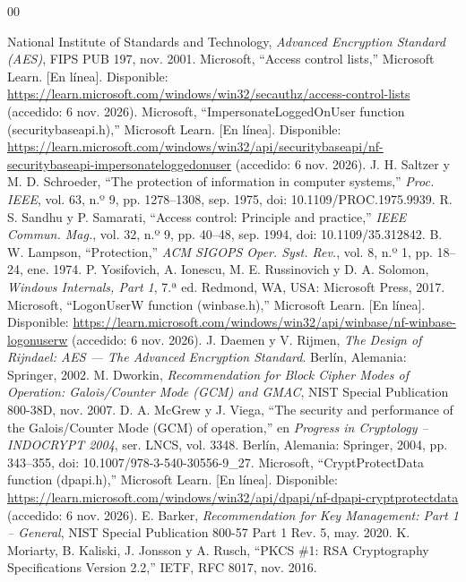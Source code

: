 \documentclass[conference]{IEEEtran}
\begin{document}
\begin{thebibliography}{00}
\raggedright
{} National Institute of Standards and Technology, \textit{Advanced Encryption Standard (AES)}, FIPS PUB 197, nov. 2001.
 Microsoft, ``Access control lists,'' Microsoft Learn. [En línea]. Disponible: \url{https://learn.microsoft.com/windows/win32/secauthz/access-control-lists} (accedido: 6 nov. 2026).
 Microsoft, ``ImpersonateLoggedOnUser function (securitybaseapi.h),'' Microsoft Learn. [En línea]. Disponible: \url{https://learn.microsoft.com/windows/win32/api/securitybaseapi/nf-securitybaseapi-impersonateloggedonuser} (accedido: 6 nov. 2026).
 J. H. Saltzer y M. D. Schroeder, ``The protection of information in computer systems,'' \textit{Proc. IEEE}, vol. 63, n.º 9, pp. 1278--1308, sep. 1975, doi: 10.1109/PROC.1975.9939.
 R. S. Sandhu y P. Samarati, ``Access control: Principle and practice,'' \textit{IEEE Commun. Mag.}, vol. 32, n.º 9, pp. 40--48, sep. 1994, doi: 10.1109/35.312842.
 B. W. Lampson, ``Protection,'' \textit{ACM SIGOPS Oper. Syst. Rev.}, vol. 8, n.º 1, pp. 18--24, ene. 1974.
 P. Yosifovich, A. Ionescu, M. E. Russinovich y D. A. Solomon, \textit{Windows Internals, Part 1}, 7.ª ed. Redmond, WA, USA: Microsoft Press, 2017.
 Microsoft, ``LogonUserW function (winbase.h),'' Microsoft Learn. [En línea]. Disponible: \url{https://learn.microsoft.com/windows/win32/api/winbase/nf-winbase-logonuserw} (accedido: 6 nov. 2026).
 J. Daemen y V. Rijmen, \textit{The Design of Rijndael: AES --- The Advanced Encryption Standard}. Berlín, Alemania: Springer, 2002.
 M. Dworkin, \textit{Recommendation for Block Cipher Modes of Operation: Galois/Counter Mode (GCM) and GMAC}, NIST Special Publication 800-38D, nov. 2007.
 D. A. McGrew y J. Viega, ``The security and performance of the Galois/Counter Mode (GCM) of operation,'' en \textit{Progress in Cryptology -- INDOCRYPT 2004}, ser. LNCS, vol. 3348. Berlín, Alemania: Springer, 2004, pp. 343--355, doi: 10.1007/978-3-540-30556-9\_27.
 Microsoft, ``CryptProtectData function (dpapi.h),'' Microsoft Learn. [En línea]. Disponible: \url{https://learn.microsoft.com/windows/win32/api/dpapi/nf-dpapi-cryptprotectdata} (accedido: 6 nov. 2026).
 E. Barker, \textit{Recommendation for Key Management: Part 1 -- General}, NIST Special Publication 800-57 Part 1 Rev. 5, may. 2020.
 K. Moriarty, B. Kaliski, J. Jonsson y A. Rusch, ``PKCS \#1: RSA Cryptography Specifications Version 2.2,'' IETF, RFC 8017, nov. 2016.

\end{thebibliography}
\end{document}
